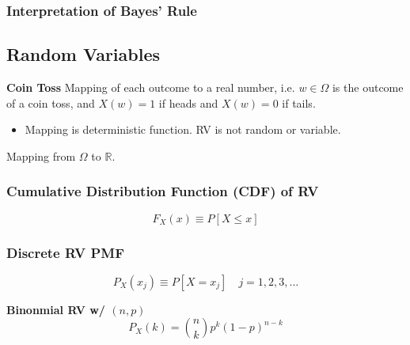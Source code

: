 \subsubsection{Interpretation of Bayes' Rule}
\begin{definition}
    
\end{definition}

\subsection{Random Variables}
\begin{motivation} \textbf{Coin Toss}
    Mapping of each outcome to a real number, i.e. $w \in \Omega$ is the outcome of a coin toss, and $X(w) = 1$ if heads and $X(w) = 0$ if tails.
    \begin{itemize}
        \item Mapping is deterministic function. RV is not random or variable.
    \end{itemize}
\end{motivation}

\begin{definition}
    Mapping from $\Omega$ to $\mathbb{R}$.
\end{definition}

\subsubsection{Cumulative Distribution Function (CDF) of RV}
\begin{definition}
    \begin{equation}
        F_X(x) \equiv P[X \leq x]
    \end{equation}
\end{definition}

\subsubsection{Discrete RV PMF}
\begin{definition}
    \begin{equation}
        P_X(x_j) \equiv P[X=x_j] \quad j=1,2,3,\ldots 
    \end{equation}
\end{definition}

\begin{example} \textbf{Binonmial RV w/ $(n,p)$}
    \begin{equation}
        P_X(k) = \binom{n}{k} p^k (1-p)^{n-k}
    \end{equation}
\end{example}

